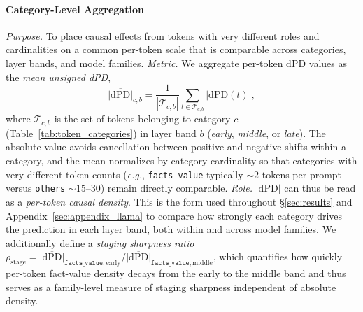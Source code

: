 \documentclass[11pt]{article}
\begin{document}
\paragraph{Category-Level Aggregation}
\textit{Purpose.} To place causal effects from tokens with very different roles and cardinalities on a common per-token scale that is comparable across categories, layer bands, and model families.
\textit{Metric.} We aggregate per-token $\mathrm{dPD}$ values as the \textit{mean unsigned dPD},
\begin{equation}
  \overline{|\mathrm{dPD}|}_{c,b} = \frac{1}{|\mathcal{T}_{c,b}|} \sum_{t \in \mathcal{T}_{c,b}} |\mathrm{dPD}(t)|,
\end{equation}
where $\mathcal{T}_{c,b}$ is the set of tokens belonging to category $c$ (Table~\ref{tab:token_categories}) in layer band $b$ (\textit{early}, \textit{middle}, or \textit{late}). The absolute value avoids cancellation between positive and negative shifts within a category, and the mean normalizes by category cardinality so that categories with very different token counts (\textit{e.g.}, \texttt{facts\_value} typically $\sim$$2$ tokens per prompt versus \texttt{others} $\sim$$15$--$30$) remain directly comparable.
\textit{Role.} $\overline{|\mathrm{dPD}|}$ can thus be read as a \textit{per-token causal density}. This is the form used throughout §\ref{sec:results} and Appendix~\ref{sec:appendix_llama} to compare how strongly each category drives the prediction in each layer band, both within and across model families. We additionally define a \textit{staging sharpness ratio} $\rho_{\text{stage}} = \overline{|\mathrm{dPD}|}_{\texttt{facts\_value},\,\text{early}} / \overline{|\mathrm{dPD}|}_{\texttt{facts\_value},\,\text{middle}}$, which quantifies how quickly per-token fact-value density decays from the early to the middle band and thus serves as a family-level measure of staging sharpness independent of absolute density.
\end{document}
